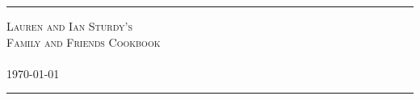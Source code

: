 \begin{titlepage}
\begin{center}
\hrule
\vspace{.7cm}
\textsc{\Huge Lauren and Ian Sturdy's \\ \vspace{0.4cm} Family and Friends Cookbook}\\[1cm]
\setlength\fboxsep{0pt}
\setlength\fboxrule{5pt}
\noindent{}\\[1cm] 
{\Huge \today}
\\[.7cm]
\hrule

\end{center}
\end{titlepage}